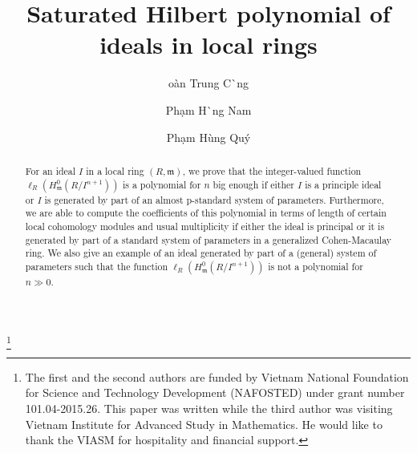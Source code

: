 \documentclass{amsart}
\theoremstyle {definition}
\theoremstyle {remark}
\begin{document}
\title[Saturated Hilbert polynomial of ideals in local rings]{Saturated Hilbert polynomial of ideals in local rings}

\author{\selectfont \DJ o\`an Trung C\uhorn{}\`\ohorn ng}
\address{\selectfont \DJ o\`an Trung C\uhorn{}\`\ohorn ng.  Institute of Mathematics, Vietnam Academy of Science and Technology, 18 Hoang Quoc Viet, 10307 Hanoi, Vietnam.} 

\author{\selectfont Ph\d am H\`\ocircumflex ng Nam} \address{\selectfont Ph\d am H\`\ocircumflex ng Nam, University of Sciences, Thai Nguyen University, Thai Nguyen, Vietnam.} 

\author{\selectfont Ph\d am H\`ung Qu\'y} \address{\selectfont Ph\d am H\`ung Qu\'y, Department of Mathematics, FPT University, and Thang Long Institute of Mathematics and Applied sciences, Thang Long University, Hanoi, Vietnam.} 

\thanks{The first and the second authors are funded by Vietnam National Foundation for Science and Technology Development (NAFOSTED) under grant number 101.04-2015.26. This paper was written while the third author was visiting Vietnam Institute for Advanced Study in Mathematics. He would like to thank the VIASM for hospitality and financial support.}


\begin{abstract}
For an ideal $I$ in a local ring $(R, {\ensuremath{\mathfrak m}})$, we prove that the integer-valued function $\ell_R(H^0_{\ensuremath{\mathfrak m}}(R/I^{n+1}))$ is a polynomial for $n$ big enough if either $I$ is a principle ideal or $I$ is generated by part of an almost p-standard system of parameters. Furthermore, we are able to compute the coefficients of this polynomial in terms of length of certain local cohomology modules and usual multiplicity if either the ideal is principal or it is generated by part of a standard system of parameters in a generalized Cohen-Macaulay ring. We also give an example of an ideal generated by part of a (general) system of parameters such that the function $\ell_R(H^0_{\ensuremath{\mathfrak m}}(R/I^{n+1}))$ is not a polynomial for $n\gg 0$.
\end{abstract}
\end{document}
